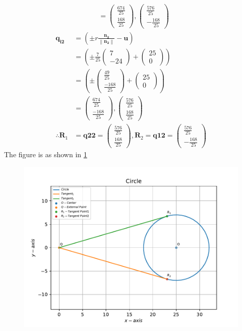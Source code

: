 \documentclass[12pt]{article}
\providecommand{\brak}[1]{\ensuremath{\left(#1\right)}}
\providecommand{\norm}[1]{\left\lVert#1\right\rVert}
\newcommand{\myvec}[1]{\ensuremath{\begin{pmatrix}#1\end{pmatrix}}}
\let\vec\mathbf
\begin{document}
\begin{enumerate}
\begin{align}
	&= \myvec{\frac{674}{25} \\ \frac{168}{25}}, \myvec{\frac{576}{25} \\ -\frac{168}{25}}
\end{align}
\begin{align}
	\vec{q_{i2}} &= \brak{\pm r \frac{\vec{n_2}}{\norm{\vec{n_2}}}- \vec{u}} \\
	&= \brak{\pm \frac{7}{25}\myvec{7 \\ -24}+ \myvec{25 \\ 0}} \\
	&= \brak{\pm \myvec{\frac{49}{25} \\ \frac{-168}{25}} + \myvec{25 \\ 0}} \\
	&= \myvec{\frac{674}{25} \\ \frac{-168}{25}}, \myvec{\frac{576}{25} \\ \frac{168}{25}}  \\
	\therefore \vec{R}_1 &= \vec{q{22}} = \myvec{\frac{576}{25} \\ \frac{168}{25}}, \vec{R}_2 = \vec{q{12}} = \myvec{\frac{576}{25} \\ -\frac{168}{25}}
\end{align}
The figure is as shown in \ref{fig:Fig1}
\begin{figure}[!h]
	\begin{center}
		\includegraphics[width=\columnwidth]{./figs/problem1.pdf}
	\end{center}
\caption{}
\label{fig:Fig1}
\end{figure}
\end{enumerate}
\end{document}
